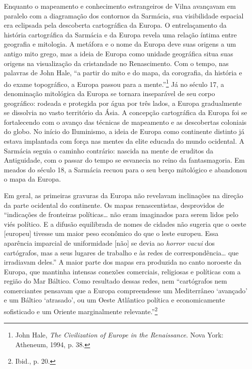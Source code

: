 Enquanto o mapeamento e conhecimento estrangeiros de Vilna avançavam em
paralelo com a diagramação dos contornos da Sarmácia, sua visibilidade
espacial era eclipsada pela descoberta cartográfica da Europa. O
entrelaçamento da história cartográfica da Sarmácia e da Europa revela
uma relação íntima entre geografia e mitologia. A metáfora e o nome da
Europa deve suas origens a um antigo mito grego, mas a ideia de Europa
como unidade geográfica situa suas origens na visualização da
cristandade no Renascimento. Com o tempo, nas palavras de John Hale, ``a
partir do mito e do mapa, da corografia, da história e do exame
topográfico, a Europa passou para a mente.''\footnote{John Hale, \textit{The Civilization of Europe in the Renaissance}. Nova York: Atheneum, 1994, p. 38.} Já no século 17, a denominação mitológica da Europa se tornara inseparável de seu corpo geográfico: rodeada e
protegida por água por três lados, a Europa gradualmente se dissolvia no
vasto território da Ásia. A concepção cartográfica da Europa foi se
fortalecendo com o avanço das técnicas de mapeamento e as descobertas
coloniais do globo. No início do Iluminismo, a ideia de Europa como
continente distinto já estava implantada com força nas mentes da elite
educada do mundo ocidental. A Sarmácia seguia o caminho contrário:
nascida na mente de eruditos da Antiguidade, com o passar do tempo se
esvanecia no reino da fantasmagoria. Em meados do século 18, a Sarmácia
recuou para o seu berço mitológico e abandonou o mapa da Europa.

Em geral, as primeiras gravuras da Europa não revelavam inclinações na
direção da parte ocidental do continente. Os mapas renascentistas,
desprovidos de ``indicações de fronteiras políticas\ldots{} não eram
imaginados para serem lidos pelo viés político. E a difusão equilibrada
de nomes de cidades não sugeria que o oeste {[}europeu{]} tivesse um
maior peso econômico do que o leste europeu. Essa aparência imparcial de
uniformidade {[}não{]} se devia ao \textit{horror vacui} dos cartógrafos,
mas a seus lugares de trabalho e às redes de correspondência\ldots{} que
irradiavam deles.'' A maior parte dos mapas era produzida no canto
noroeste da Europa, que mantinha intensas conexões comerciais,
religiosas e políticas com a região do Mar Báltico. Como resultado
dessas redes, nem ``cartógrafos nem comerciantes pensavam que a Europa
compreendesse um Mediterrâneo `avançado' e um Báltico `atrasado', ou um
Oeste Atlântico política e economicamente sofisticado e um Oriente
marginalmente relevante.''\footnote{Ibid., p. 20.}

